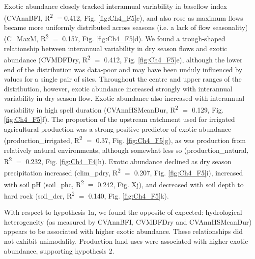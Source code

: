 \documentclass[openright,12pt,a4paper]{memoir}
\begin{document}
Exotic abundance closely tracked interannual variability in baseflow index (CVAnnBFI, R\textsuperscript{2}  $=$0.412, Fig. \ref{fig:Ch4_F5}c), and also rose as maximum flows became more uniformly distributed across seasons (i.e. a lack of flow seasonality) (C\_MaxM, R\textsuperscript{2}  $=$ 0.157, Fig. \ref{fig:Ch4_F5}d). We found a trough-shaped relationship between interannual variability in dry season flows and exotic abundance (CVMDFDry, R\textsuperscript{2}  $=$ 0.412, Fig. \ref{fig:Ch4_F5}e), although the lower end of the distribution was data-poor and may have been unduly influenced by values for a single pair of sites. Throughout the centre and upper ranges of the distribution, however, exotic abundance increased strongly with interannual variability in dry season flow. Exotic abundance also increased with interannual variability in high spell duration (CVAnnHSMeanDur, R\textsuperscript{2}  $=$ 0.129, Fig. \ref{fig:Ch4_F5}f). The proportion of the upstream catchment used for irrigated agricultural production was a strong positive predictor of exotic abundance (production\_irrigated, R\textsuperscript{2}  $=$ 0.37, Fig. \ref{fig:Ch4_F5}g), as was production from relatively natural environments, although somewhat less so (production\_natural, R\textsuperscript{2}  $=$ 0.232, Fig. \ref{fig:Ch4_F4}h). Exotic abundance declined as dry season precipitation increased (clim\_pdry, R\textsuperscript{2}  $=$ 0.207, Fig. \ref{fig:Ch4_F5}i), increased with soil pH (soil\_phc, R\textsuperscript{2}  $=$ 0.242, Fig. Xj), and decreased with soil depth to hard rock (soil\_der, R\textsuperscript{2}  $=$ 0.140, Fig. \ref{fig:Ch4_F5}k).

With respect to hypothesis 1a, we found the opposite of expected: hydrological heterogeneity (as measured by CVAnnBFI, CVMDFDry and CVAnnHSMeanDur) appears to be associated with higher exotic abundance. These relationships did not exhibit unimodality. Production land uses were associated with higher exotic abundance, supporting hypothesis 2.
\end{document}
